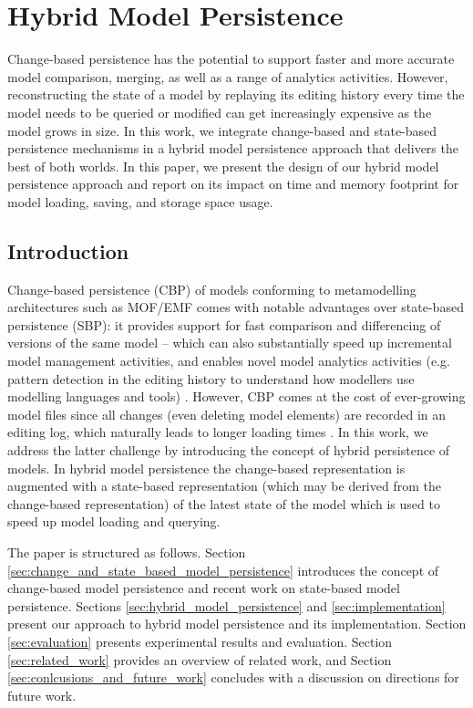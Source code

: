\chapter{Hybrid Model Persistence}
\label{ch:hybrid_model_persistence}
Change-based persistence has the potential to support faster and more accurate model comparison, merging, as well as a range of analytics activities. However, reconstructing the state of a model by replaying its editing history every time the model needs to be queried or modified can get increasingly expensive as the model grows in size. In this work, we integrate change-based and state-based persistence mechanisms in a hybrid model persistence approach that delivers the best of both worlds. In this paper, we present the design of our hybrid model persistence approach and report on its impact on time and memory footprint for model loading, saving, and storage space usage.

\vspace{-20pt}
\section{Introduction}
\label{sec:introduction}
Change-based persistence (CBP) of models \cite{DBLP:conf/models/YohannisKP17} conforming to metamodelling architectures such as MOF/EMF \cite{omg2018mof,steinberg2008emf} comes with notable advantages over state-based persistence (SBP): it provides support for fast comparison and differencing of versions of the same model \cite{DBLP:conf/sde/LippeO92,DBLP:conf/caise/IgnatN05,DBLP:conf/edoc/KoegelHLHD10,koegel2010emfstore} -- which can also substantially speed up incremental model management activities, and enables novel model analytics activities (e.g. pattern detection in the editing history to understand how modellers use modelling languages and tools) \cite{DBLP:journals/entcs/RobbesL07}. However, CBP comes at the cost of ever-growing model files \cite{DBLP:conf/edoc/KoegelHLHD10,DBLP:journals/entcs/RobbesL07} since all changes (even deleting model elements) are recorded in an editing log, which naturally leads to longer loading times \cite{mens2002state}. In this work, we address the latter challenge by introducing the concept of hybrid persistence of models. In hybrid model persistence the change-based representation is augmented with a state-based representation (which may be derived from the change-based representation) of the latest state of the model which is used to speed up model loading and querying.

The paper is structured as follows. Section \ref{sec:change_and_state_based_model_persistence} introduces the concept of change-based model persistence and recent work on state-based model persistence. Sections \ref{sec:hybrid_model_persistence} and \ref{sec:implementation} present our approach to hybrid model persistence and its implementation. Section \ref{sec:evaluation} presents experimental results and evaluation. Section \ref{sec:related_work} provides an overview of related work, and Section \ref{sec:conlcusions_and_future_work} concludes with a discussion on directions for future work.

